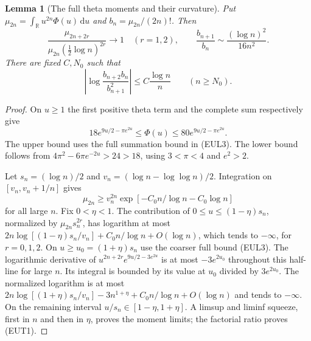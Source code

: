 \documentclass[11pt]{article}
\newtheorem{lemma}[theorem]{Lemma}
\theoremstyle{remark}\newtheorem{remark}[theorem]{Remark}
\newcommand{\R}{\mathbb R}
\newcommand{\dd}{\,\mathrm d}
\begin{document}
\begin{lemma}[The full theta moments and their curvature]
\label{lem:euler-moment-curvature}
Put $\mu_{2n}=\int_\R u^{2n}\Phi(u)\dd u$ and
$b_n=\mu_{2n}/(2n)!$. Then
\[
 \frac{\mu_{2n+2r}}{\mu_{2n}(\tfrac12\log n)^{2r}}\longrightarrow1
       \quad(r=1,2),\qquad
 \frac{b_{n+1}}{b_n}\sim\frac{(\log n)^2}{16n^2}.         \tag{EUT1}
\]
There are fixed $C,N_0$ such that
\[
 \left|\log\frac{b_{n+2}b_n}{b_{n+1}^2}\right|
           \le C\frac{\log n}{n}\qquad(n\ge N_0).        \tag{EUT2}
\]
\end{lemma}
\begin{proof}
On $u\ge1$ the first positive theta term and the complete
sum respectively give
\[
 18e^{9u/2-\pi e^{2u}}\le\Phi(u)
                         \le80e^{9u/2-\pi e^{2u}}.      \tag{EUT3}
\]
The upper bound uses the full summation bound in (EUL3).
The lower bound follows from $4\pi^2-6\pi e^{-2u}>24>18$,
using $3<\pi<4$ and $e^2>2$.

Let $s_n=(\log n)/2$ and
$v_n=(\log n-\log\log n)/2$.
Integration on $[v_n,v_n+1/n]$ gives
\[
 \mu_{2n}\ge v_n^{2n}
       \exp[-C_0n/\log n-C_0\log n]                     \tag{EUT4}
\]
for all large $n$. Fix $0<\eta<1$.
The contribution of $0\le u\le(1-\eta)s_n$, normalized by
$\mu_{2n}s_n^{2r}$, has logarithm at most
$2n\log[(1-\eta)s_n/v_n]+C_0n/\log n+O(\log n)$,
which tends to $-\infty$, for $r=0,1,2$.
On $u\ge u_0=(1+\eta)s_n$ use the coarser full bound (EUL3).
The logarithmic derivative of
$u^{2n+2r}e^{9u/2-3e^{2u}}$ is at most
$-3e^{2u_0}$ throughout this half-line for large $n$.
Its integral is bounded by its value at $u_0$ divided
by $3e^{2u_0}$. The normalized logarithm is at most
$2n\log[(1+\eta)s_n/v_n]-3n^{1+\eta}
+C_0n/\log n+O(\log n)$ and tends to $-\infty$.
On the remaining interval $u/s_n\in[1-\eta,1+\eta]$.
A limsup and liminf squeeze, first in $n$ and then in $\eta$,
proves the moment limits; the factorial ratio proves (EUT1).


\end{proof}
\end{document}

